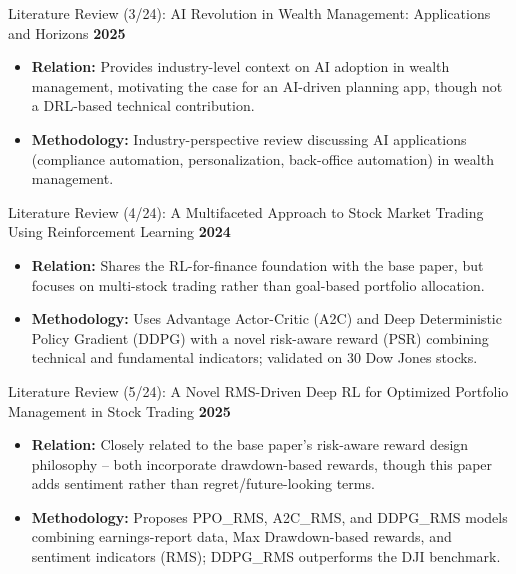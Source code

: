 \documentclass{beamer}
\begin{document}
\begin{frame}{Literature Review (3/24): AI Revolution in Wealth Management: Applications and Horizons}
\small
\textbf{2025}
\begin{itemize}
    \item \textbf{Relation:} Provides industry-level context on AI adoption in wealth management, motivating the case for an AI-driven planning app, though not a DRL-based technical contribution.
    \item \textbf{Methodology:} Industry-perspective review discussing AI applications (compliance automation, personalization, back-office automation) in wealth management.
\end{itemize}
\end{frame}

\begin{frame}{Literature Review (4/24): A Multifaceted Approach to Stock Market Trading Using Reinforcement Learning}
\small
\textbf{2024}
\begin{itemize}
    \item \textbf{Relation:} Shares the RL-for-finance foundation with the base paper, but focuses on multi-stock trading rather than goal-based portfolio allocation.
    \item \textbf{Methodology:} Uses Advantage Actor-Critic (A2C) and Deep Deterministic Policy Gradient (DDPG) with a novel risk-aware reward (PSR) combining technical and fundamental indicators; validated on 30 Dow Jones stocks.
\end{itemize}
\end{frame}

\begin{frame}{Literature Review (5/24): A Novel RMS-Driven Deep RL for Optimized Portfolio Management in Stock Trading}
\small
\textbf{2025}
\begin{itemize}
    \item \textbf{Relation:} Closely related to the base paper's risk-aware reward design philosophy -- both incorporate drawdown-based rewards, though this paper adds sentiment rather than regret/future-looking terms.
    \item \textbf{Methodology:} Proposes PPO\_RMS, A2C\_RMS, and DDPG\_RMS models combining earnings-report data, Max Drawdown-based rewards, and sentiment indicators (RMS); DDPG\_RMS outperforms the DJI benchmark.
\end{itemize}
\end{frame}
\end{document}
